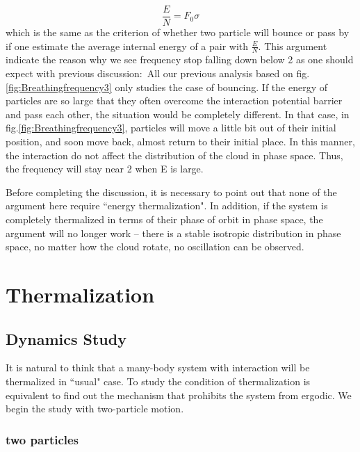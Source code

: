 \documentclass[aps,pre,twocolumn,groupedaddress]{revtex4-1}
\begin{document}
\begin{equation}
\frac{E}{N}=F_0\sigma
\end{equation}
which is the same as the criterion of whether two particle will bounce or pass by if one estimate the average internal energy of a pair with $\frac{E}{N}$. This argument indicate the reason why we see frequency stop falling down below 2 as one should expect with previous discussion:\
All our previous analysis based on fig.\ref{fig:Breathingfrequency3} only studies the case of bouncing. If the energy of particles are so large that they often overcome the interaction potential barrier and pass each other, the situation would be completely different. In that case, in fig.\ref{fig:Breathingfrequency3}, particles will move a little bit out of their initial position, and soon move back, almost return to their initial place. In this manner, the interaction do not affect the distribution of the cloud in phase space. Thus, the frequency will stay near 2 when E is large.

Before completing the discussion, it is necessary to point out that none of the argument here require ``energy thermalization". In addition, if the system is completely thermalized in terms of their phase of orbit in phase space, the argument will no longer work -- there is a stable isotropic distribution in phase space, no matter how the cloud rotate, no oscillation can be observed.


\section{Thermalization}\label{section:Thermalization}
\subsection{Dynamics Study}
It is natural to think that a many-body system with interaction will be thermalized in ``usual" case. To study the condition of thermalization is equivalent to find out the mechanism that prohibits the system from ergodic. We begin the study with two-particle motion. 
\subsubsection{two particles}
\end{document}
